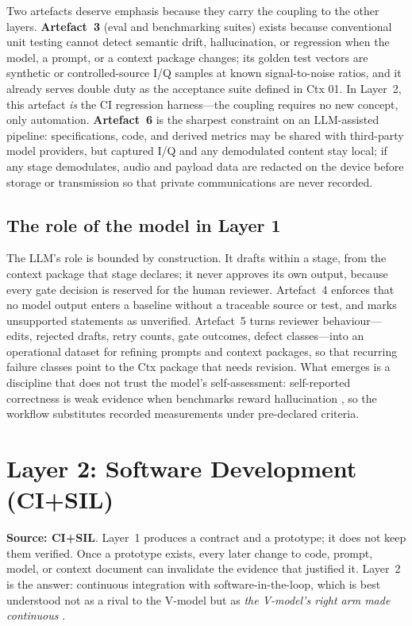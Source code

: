 \documentclass[11pt,a4paper]{article}
\begin{document}
Two artefacts deserve emphasis because they carry the coupling to the other layers. \textbf{Artefact~3}
(eval and benchmarking suites) exists because conventional unit testing cannot detect semantic
drift, hallucination, or regression when the model, a prompt, or a context package changes; its
golden test vectors are synthetic or controlled-source I/Q samples at known signal-to-noise
ratios, and it already serves double duty as the acceptance suite defined in Ctx 01. In
Layer~2, this artefact \emph{is} the CI regression harness---the coupling requires no new
concept, only automation. \textbf{Artefact~6} is the sharpest constraint on an LLM-assisted
pipeline: specifications, code, and derived metrics may be shared with third-party model
providers, but captured I/Q and any demodulated content stay local; if any stage demodulates,
audio and payload data are redacted on the device before storage or transmission so that private
communications are never recorded.

\subsection{The role of the model in Layer 1}
\label{sec:llmrole}

The LLM's role is bounded by construction. It drafts within a stage, from the context package
that stage declares; it never approves its own output, because every gate decision is reserved
for the human reviewer. Artefact~4 enforces that no model output enters a baseline without a
traceable source or test, and marks unsupported statements as unverified. Artefact~5 turns
reviewer behaviour---edits, rejected drafts, retry counts, gate outcomes, defect classes---into
an operational dataset for refining prompts and context packages, so that recurring failure
classes point to the Ctx package that needs revision. What emerges is a discipline that does not
trust the model's self-assessment: self-reported correctness is weak evidence when benchmarks
reward hallucination \cite{kalai2026}, so the workflow substitutes recorded measurements under
pre-declared criteria.

\section{Layer 2: Software Development (CI+SIL)}
\label{sec:layer2}

\textbf{Source: CI+SIL}. Layer~1 produces a contract and a prototype; it does not keep them
verified. Once a prototype exists, every later change to code, prompt, model, or context document
can invalidate the evidence that justified it. Layer~2 is the answer: continuous integration with
software-in-the-loop, which is best understood not as a rival to the V-model but as \emph{the
V-model's right arm made continuous} \cite{sheridan2026a}.
\end{document}
